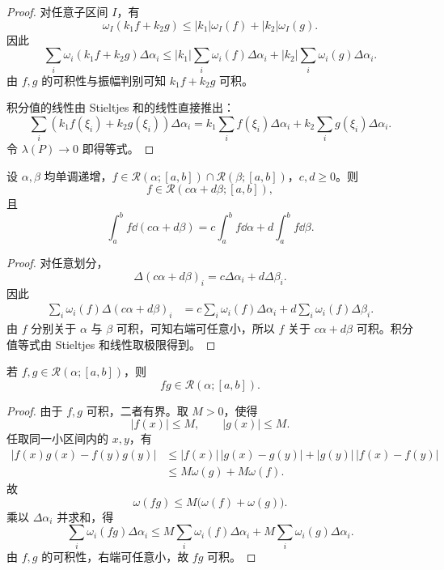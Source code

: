 \begin{proof}
	对任意子区间 $I$，有
	\[
	\omega_I(k_1f+k_2g)
	\leq |k_1|\omega_I(f)+|k_2|\omega_I(g).
	\]
	因此
	\[
	\sum_i\omega_i(k_1f+k_2g)\Delta\alpha_i
	\leq |k_1|\sum_i\omega_i(f)\Delta\alpha_i
	+|k_2|\sum_i\omega_i(g)\Delta\alpha_i.
	\]
	由 $f,g$ 的可积性与振幅判别可知 $k_1f+k_2g$ 可积。
	
	积分值的线性由 Stieltjes 和的线性直接推出：
	\[
	\sum_i (k_1f(\xi_i)+k_2g(\xi_i))\Delta\alpha_i
	=k_1\sum_i f(\xi_i)\Delta\alpha_i
	+k_2\sum_i g(\xi_i)\Delta\alpha_i.
	\]
	令 $\lambda(P)\to0$ 即得等式。
\end{proof}

\begin{proposition}\label{prop:linear-integrator}
	设 $\alpha,\beta$ 均单调递增，$f\in\mathcal R(\alpha;[a,b])\cap\mathcal R(\beta;[a,b])$，$c,d\geq0$。则
	\[
	f\in\mathcal R(c\alpha+d\beta;[a,b]),
	\]
	且
	\[
	\int_a^b f\dd(c\alpha+d\beta)
	=c\int_a^b f\dd\alpha+d\int_a^b f\dd\beta.
	\]
\end{proposition}

\begin{proof}
	对任意划分，
	\[
	\Delta(c\alpha+d\beta)_i
	=c\Delta\alpha_i+d\Delta\beta_i.
	\]
	因此
	\[
	\begin{aligned}
		\sum_i\omega_i(f)\Delta(c\alpha+d\beta)_i
		&=c\sum_i\omega_i(f)\Delta\alpha_i
		+d\sum_i\omega_i(f)\Delta\beta_i.
	\end{aligned}
	\]
	由 $f$ 分别关于 $\alpha$ 与 $\beta$ 可积，可知右端可任意小，所以 $f$ 关于 $c\alpha+d\beta$ 可积。积分值等式由 Stieltjes 和线性取极限得到。
\end{proof}

\begin{proposition}\label{prop:product-stieltjes}
	若 $f,g\in\mathcal R(\alpha;[a,b])$，则
	\[
	fg\in\mathcal R(\alpha;[a,b]).
	\]
\end{proposition}

\begin{proof}
	由于 $f,g$ 可积，二者有界。取 $M>0$，使得
	\[
	|f(x)|\leq M,
	\qquad
	|g(x)|\leq M.
	\]
	任取同一小区间内的 $x,y$，有
	\[
	\begin{aligned}
		|f(x)g(x)-f(y)g(y)|
		&\leq |f(x)|\,|g(x)-g(y)|+|g(y)|\,|f(x)-f(y)| \\
		&\leq M\omega(g)+M\omega(f).
	\end{aligned}
	\]
	故
	\[
	\omega(fg)\leq M\bigl(\omega(f)+\omega(g)\bigr).
	\]
	乘以 $\Delta\alpha_i$ 并求和，得
	\[
	\sum_i\omega_i(fg)\Delta\alpha_i
	\leq M\sum_i\omega_i(f)\Delta\alpha_i
	+M\sum_i\omega_i(g)\Delta\alpha_i.
	\]
	由 $f,g$ 的可积性，右端可任意小，故 $fg$ 可积。
\end{proof}

